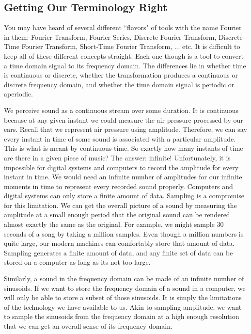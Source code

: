 \subsection*{Getting Our Terminology Right}

You may have heard of several different ``flavors" of tools with the name Fourier in them: Fourier Transform,
Fourier Series, Discrete Fourier Transform, Discrete-Time Fourier Transform, Short-Time Fourier Transform, ... etc.
It is difficult to keep all of these different concepts straight.  Each one though is a tool to convert a time domain
signal to its frequency domain.  The differences lie in whether time is continuous or discrete, whether the
transformation produces a continuous or discrete frequency domain, and whether the time domain signal is 
periodic or aperiodic. 

We perceive sound as a continuous stream over some duration.  It is continuous because at any given instant
we could measure the air pressure processed by our ears.  Recall that we represent air pressure using
amplitude.  Therefore, we can say every instant in time of some sound is associated with a particular 
amplitude.  This is what
is meant by continuous time.  So exactly how many instants of time are there in a given piece of music?
The answer: infinite!  Unfortunately, it is impossible for
digital systems and computers to record the amplitude for every instant in time.  We would need an infinite 
number of amplitudes for our infinite moments in
time to represent every recorded sound properly.  Computers and digital systems can only store a finite amount of data.  Sampling is a compromise for
this limitation.   We can get the overall picture of a sound by 
measuring the amplitude at a small enough period that the original sound can be rendered 
almost exactly the same as the original.  For example, we might sample 30 seconds of a song by taking
a million samples.  Even though a million numbers is quite large, our modern machines can comfortably
store that amount of data.  Sampling generates a finite amount of data, and any finite set of data can be
stored on a computer as long as its not too large.

Similarly, a sound in the frequency domain can be made of an infinite number of sinusoids.  If
we want to store the frequency domain of a sound in a computer, we will only be able to store a subset of those
sinusoids.  It is simply the limitations of the technology we have available to us.  Akin to sampling amplitude,
we want to sample the sinusoids from the frequency domain at a high enough resolution that we can get
an overall sense of its frequency domain.

